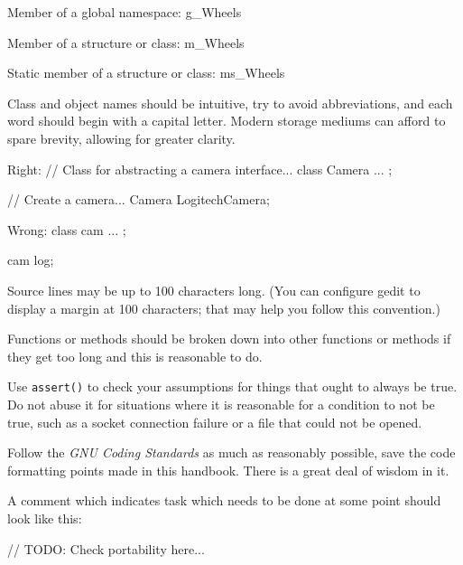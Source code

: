Member of a global namespace:
\startCodeExample
g_Wheels
\stopCodeExample

Member of a structure or class:
\startCodeExample
m_Wheels
\stopCodeExample

Static member of a structure or class:
\startCodeExample
ms_Wheels
\stopCodeExample

\item
Class and object names should be intuitive, try to avoid abbreviations, and each word should begin with a capital letter. Modern storage mediums can afford to spare brevity, allowing for greater clarity.


Right:
\startCodeExample
// Class for abstracting a camera interface...
class Camera
{
    ...
};

// Create a camera...
Camera LogitechCamera;
\stopCodeExample

Wrong:
\startCodeExample
class cam
{
    ...
};

cam log;
\stopCodeExample

\stopitemize


\startitemize[3]
\setupwhitespace[big]
\item
Source lines may be up to 100 characters long. (You can configure gedit to display a margin at 100 characters; that may help you follow this convention.)

\item
Functions or methods should be broken down into other functions or methods if they get too long and this is reasonable to do.

\item
Use {\tt assert()} to check your assumptions for things that ought to always be true. Do not abuse it for situations where it is reasonable for a condition to not be true, such as a socket connection failure or a file that could not be opened.

\item
Follow the {\it GNU Coding Standards} as much as reasonably possible, save the code formatting points made in this handbook. There is a great deal of wisdom in it.

\item
A comment which indicates task which needs to be done at some point should look like this: 

\startCodeExample
// TODO: Check portability here...
\stopCodeExample

\stopitemize


